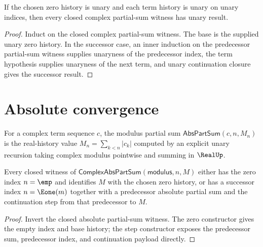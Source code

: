 \begin{theorem}
\label{thm:complex-part-sum-result-unary}
If the chosen zero history is unary and each term history is unary on unary
indices, then every closed complex partial-sum witness has unary result.
\end{theorem}
\begin{proof}
Induct on the closed complex partial-sum witness. The base is the supplied
unary zero history. In the successor case, an inner induction on the
predecessor partial-sum witness supplies unaryness of the predecessor index,
the term hypothesis supplies unaryness of the next term, and unary continuation
closure gives the successor result.
\end{proof}

\section{Absolute convergence}

\begin{definition}
\label{def:abs-part-sum}
For a complex term sequence \(c\), the modulus partial sum \(\mathsf{AbsPartSum}(c, n, M_n)\) is the real-history value \(M_n = \sum_{k < n} |c_k|\) computed by an explicit unary recursion taking complex modulus pointwise and summing in \(\RealUp\).
\end{definition}

\begin{lemma}
\label{lem:complex-abs-part-sum-index-cases}
Every closed witness of $\mathsf{ComplexAbsPartSum}(\mathsf{modulus},n,M)$
either has the zero index $n=\emp$ and identifies $M$ with the chosen zero
history, or has a successor index $n=\Eone(m)$ together with a predecessor
absolute partial sum and the continuation step from that predecessor to $M$.
\end{lemma}
\begin{proof}
Invert the closed absolute partial-sum witness. The zero constructor gives the
empty index and base history; the step constructor exposes the predecessor
sum, predecessor index, and continuation payload directly.
\end{proof}

